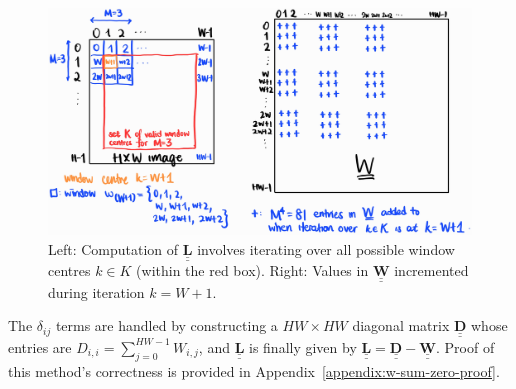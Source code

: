 \documentclass{article}
\def\vt#1{\underline{\mathbf{#1}}}
\def\vts#1{\underline{\boldsymbol{#1}}}
\def\mt#1{\underline{\underline{\mathbf{#1}}}}
\def\mts#1{\underline{\underline{\boldsymbol{#1}}}}
\begin{document}
\begin{multicols}{2}[]



\begin{figure}[H]
    \centering
    \includegraphics[width=\linewidth]{index-displacement}
    \caption{Left: Computation of $\mt L$ involves iterating over all possible window centres $k\in K$ (within the red box). Right: Values in $\mt W$ incremented during iteration $k=W+1$.}
    \label{fig:index-displacement}
\end{figure}
The $\delta_{ij}$ terms are handled by constructing a $HW\times HW$ diagonal matrix $\mt D$ whose entries are $D_{i,i} = \sum_{j=0}^{HW-1} W_{i,j}$, and $\mt L$ is finally given by $\mt L = \mt D - \mt W$. Proof of this method's correctness is provided in Appendix~\ref{appendix:w-sum-zero-proof}.


\end{multicols}
\end{document}
